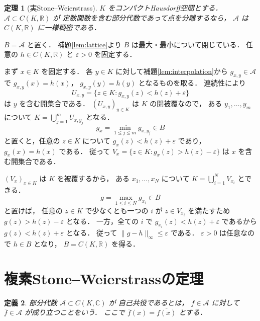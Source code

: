 \documentclass[a5paper,10pt,onecolumn]{jsarticle}
\makeatletter
\theoremstyle{mathnotetheorem}
\newtheorem{theorem}{定理}[section]
\newtheorem{definition}[theorem]{定義}
\renewcommand{\proofname}{証明}
\renewenvironment{proof}[1][\proofname]{%
  \par\pushQED{\qed}\normalfont\topsep4\p@\@plus2\p@\relax
  \trivlist\item[\hskip\labelsep\bfseries #1]\ignorespaces
}{\popQED\endtrivlist\@endpefalse}
\newcommand{\norm}[1]{\lVert #1\rVert}
\makeatother
\begin{document}
\begin{theorem}[実Stone--Weierstrass]\label{thm:real-sw}
$K$ をコンパクトHausdorff空間とする．
$\mathcal A\subset C(K,\mathbb R)$ が
定数関数を含む部分代数であって点を分離するなら，
$\mathcal A$ は $C(K,\mathbb R)$ に一様稠密である．
\end{theorem}
\begin{proof}
$B=\overline{\mathcal A}$ と置く．
補題\ref{lem:lattice}より $B$ は最大・最小について閉じている．
任意の $h\in C(K,\mathbb R)$ と $\varepsilon>0$ を固定する．

まず $x\in K$ を固定する．
各 $y\in K$ に対して補題\ref{lem:interpolation}から
$g_{x,y}\in\mathcal A$ で
$g_{x,y}(x)=h(x)$，
$g_{x,y}(y)=h(y)$ となるものを取る．
連続性により
\[
 U_{x,y}=\{z\in K:g_{x,y}(z)<h(z)+\varepsilon\}
\]
は $y$ を含む開集合である．
$(U_{x,y})_{y\in K}$ は $K$ の開被覆なので，
ある $y_1,\dots,y_m$ について
$K=\bigcup_{j=1}^mU_{x,y_j}$ となる．
\[
 g_x=\min_{1\le j\le m}g_{x,y_j}\in B
\]
と置くと，任意の $z\in K$ について
$g_x(z)<h(z)+\varepsilon$ であり，
$g_x(x)=h(x)$ である．
従って
$V_x=\{z\in K:g_x(z)>h(z)-\varepsilon\}$
は $x$ を含む開集合である．

$(V_x)_{x\in K}$ は $K$ を被覆するから，
ある $x_1,\dots,x_N$ について
$K=\bigcup_{i=1}^NV_{x_i}$ とできる．
\[
 g=\max_{1\le i\le N}g_{x_i}\in B
\]
と置けば，
任意の $z\in K$ で少なくとも一つの $i$ が
$z\in V_{x_i}$ を満たすため
$g(z)>h(z)-\varepsilon$ となる．
一方，全ての $i$ で
$g_{x_i}(z)<h(z)+\varepsilon$ であるから
$g(z)<h(z)+\varepsilon$ となる．
従って $\norm{g-h}_\infty\le\varepsilon$ である．
$\varepsilon>0$ は任意なので $h\in B$ となり，
$B=C(K,\mathbb R)$ を得る．
\end{proof}

\section{複素Stone--Weierstrassの定理}

\begin{definition}
部分代数 $\mathcal A\subset C(K,\mathbb C)$ が
\emph{自己共役}であるとは，
$f\in\mathcal A$ に対して
$\overline f\in\mathcal A$ が成り立つことをいう．
ここで $\overline f(x)=\overline{f(x)}$ とする．
\end{definition}
\end{document}
